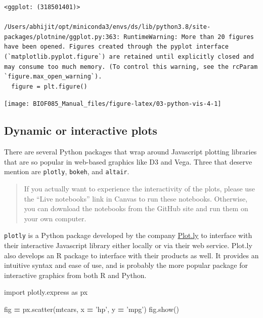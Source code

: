 \documentclass[
  letterpaper,
]{scrbook}
\newenvironment{Shaded}{\begin{snugshade}}{\end{snugshade}}
\newcommand{\ImportTok}[1]{#1}
\newcommand{\NormalTok}[1]{#1}
\newcommand{\OperatorTok}[1]{\textcolor[rgb]{0.81,0.36,0.00}{\textbf{#1}}}
\newcommand{\StringTok}[1]{\textcolor[rgb]{0.31,0.60,0.02}{#1}}
\begin{document}
\begin{verbatim}
<ggplot: (318501401)>

/Users/abhijit/opt/miniconda3/envs/ds/lib/python3.8/site-packages/plotnine/ggplot.py:363: RuntimeWarning: More than 20 figures have been opened. Figures created through the pyplot interface (`matplotlib.pyplot.figure`) are retained until explicitly closed and may consume too much memory. (To control this warning, see the rcParam `figure.max_open_warning`).
  figure = plt.figure()
\end{verbatim}

\begin{center}\texttt{[image: BIOF085\_Manual\_files/figure-latex/03-python-vis-4-1]} \end{center}

\hypertarget{dynamic-or-interactive-plots}{%
\subsection{Dynamic or interactive plots}\label{dynamic-or-interactive-plots}}

There are several Python packages that wrap around Javascript plotting libraries that are so popular in web-based graphics like D3 and Vega. Three that deserve mention are \texttt{plotly}, \texttt{bokeh}, and \texttt{altair}.

\begin{quote}
If you actually want to experience the interactivity of the plots, please use the ``Live notebooks'' link in Canvas to run these notebooks. Otherwise, you can download the notebooks from the GitHub site and run them on your own computer.
\end{quote}

\texttt{plotly} is a Python package developed by the company \href{https://www.plotly.com}{Plot.ly} to interface with their interactive Javascript library either locally or via their web service. Plot.ly also develops an R package to interface with their products as well. It provides an intuitive syntax and ease of use, and is probably the more popular package for interactive graphics from both R and Python.

\begin{Shaded}
\begin{Highlighting}[]
\ImportTok{import}\NormalTok{ plotly.express }\ImportTok{as}\NormalTok{ px}

\NormalTok{fig }\OperatorTok{=}\NormalTok{ px.scatter(mtcars, x }\OperatorTok{=} \StringTok{'hp'}\NormalTok{, y }\OperatorTok{=} \StringTok{'mpg'}\NormalTok{)}
\NormalTok{fig.show()}
\end{Highlighting}
\end{Shaded}
\end{document}
